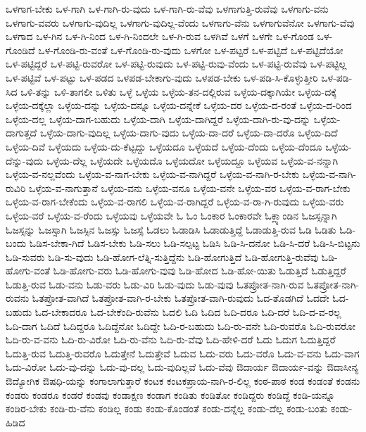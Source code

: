 {ಒಳಗಾಗ-ಬೇಕು
ಒಳ-ಗಾಗಿ
ಒಳ-ಗಾಗಿ-ರು-ವುದು
ಒಳ-ಗಾಗಿ-ರು-ವೆವು
ಒಳಗಾಗುತ್ತಿ-ರುವೆವು
ಒಳಗಾಗು-ವನು
ಒಳಗಾಗು-ವವರು
ಒಳಗಾಗು-ವುದಿಲ್ಲ
ಒಳಗಾಗು-ವುದಿಲ್ಲ-ವೆಂದು
ಒಳಗಾಗು-ವೆನು
ಒಳಗಾಗುವೆನೋ
ಒಳಗಾಗು-ವೆವು
ಒಳಗಾದ
ಒಳ-ಗಿನ
ಒಳ-ಗಿ-ನಿಂದ
ಒಳ-ಗಿ-ನಿಂದಲೇ
ಒಳ-ಗಿ-ರುವ
ಒಳಗಿವೆ
ಒಳಗೆ
ಒಳಗೇ
ಒಳ-ಗೊಂಡ
ಒಳ-ಗೊಂಡಿದೆ
ಒಳ-ಗೊಂಡಿ-ರು-ವಂತೆ
ಒಳ-ಗೊಂಡಿ-ರು-ವುದು
ಒಳಗೋ
ಒಳ-ಪಟ್ಟರೆ
ಒಳ-ಪಟ್ಟಿದೆ
ಒಳ-ಪಟ್ಟಿದೆಯೋ
ಒಳ-ಪಟ್ಟಿದ್ದರೆ
ಒಳ-ಪಟ್ಟಿ-ರುವರೋ
ಒಳ-ಪಟ್ಟಿ-ರುವುದು
ಒಳ-ಪಟ್ಟಿ-ರುವು-ವೆಂದು
ಒಳ-ಪಟ್ಟಿ-ರುವೆವು
ಒಳ-ಪಟ್ಟಿಲ್ಲ
ಒಳ-ಪಟ್ಟಿವೆ
ಒಳ-ಪಟ್ಟು
ಒಳ-ಪಡದ
ಒಳಪಡ-ಬೇಕಾಗು-ವುದು
ಒಳಪಡ-ಬೇಕು
ಒಳ-ಪಡಿ-ಸಿ-ಕೊಳ್ಳುತ್ತೀರಿ
ಒಳ-ಪಡಿ-ಸಿದ
ಒಳಿ-ತನ್ನು
ಒಳಿ-ತಾಗಲೀ
ಒಳಿತು
ಒಳ್ಳೆ
ಒಳ್ಳೆಯ
ಒಳ್ಳೆಯ-ತನ-ದಲ್ಲಿರುವ
ಒಳ್ಳೆಯ-ದಕ್ಕಾಗಿಯೇ
ಒಳ್ಳೆಯ-ದಕ್ಕೆ
ಒಳ್ಳೆಯ-ದಕ್ಕೆಲ್ಲಾ
ಒಳ್ಳೆಯ-ದನ್ನು
ಒಳ್ಳೆಯ-ದನ್ನೂ
ಒಳ್ಳೆಯ-ದನ್ನೇಕೆ
ಒಳ್ಳೆಯ-ದರ
ಒಳ್ಳೆಯ-ದ-ರಂತೆ
ಒಳ್ಳೆಯ-ದ-ರಿಂದ
ಒಳ್ಳೆಯ-ದಲ್ಲ
ಒಳ್ಳೆಯ-ದಾಗ-ಬಹುದು
ಒಳ್ಳೆಯ-ದಾಗಿ
ಒಳ್ಳೆಯ-ದಾಗಿದ್ದರೆ
ಒಳ್ಳೆಯ-ದಾಗಿ-ರು-ವು-ದನ್ನು
ಒಳ್ಳೆಯ-ದಾಗುತ್ತದೆ
ಒಳ್ಳೆಯ-ದಾಗು-ವುದಿಲ್ಲ
ಒಳ್ಳೆಯ-ದಾಗು-ವುದು
ಒಳ್ಳೆಯ-ದಾ-ದರೆ
ಒಳ್ಳೆಯ-ದಾ-ದರೊ
ಒಳ್ಳೆಯ-ದಿದೆ
ಒಳ್ಳೆಯ-ದಿವೆ
ಒಳ್ಳೆಯದು
ಒಳ್ಳೆಯ-ದು-ಕೆಟ್ಟದ್ದು
ಒಳ್ಳೆಯದೂ
ಒಳ್ಳೆಯದೆ
ಒಳ್ಳೆಯ-ದೆಂದು
ಒಳ್ಳೆಯ-ದೆಂದೂ
ಒಳ್ಳೆಯ-ದೆನ್ನು-ವುದು
ಒಳ್ಳೆಯ-ದೆಲ್ಲ
ಒಳ್ಳೆಯದೇ
ಒಳ್ಳೆಯದೊ
ಒಳ್ಳೆಯದೋ
ಒಳ್ಳೆಯದ್ದೂ
ಒಳ್ಳೆಯವ
ಒಳ್ಳೆಯ-ವ-ನನ್ನಾಗಿ
ಒಳ್ಳೆಯ-ವ-ನಲ್ಲವೆಂದು
ಒಳ್ಳೆಯ-ವ-ನಾಗ-ಬೇಕು
ಒಳ್ಳೆಯ-ವ-ನಾಗಿದ್ದರೆ
ಒಳ್ಳೆಯ-ವ-ನಾಗಿ-ರ-ಬೇಕು
ಒಳ್ಳೆಯ-ವ-ನಾಗಿ-ರುವಿರಿ
ಒಳ್ಳೆಯ-ವ-ನಾಗುತ್ತಾನೆ
ಒಳ್ಳೆಯ-ವನು
ಒಳ್ಳೆಯ-ವನೂ
ಒಳ್ಳೆಯ-ವನೇ
ಒಳ್ಳೆಯ-ವರ
ಒಳ್ಳೆಯ-ವ-ರಾಗ-ಬೇಕು
ಒಳ್ಳೆಯ-ವ-ರಾಗ-ಬೇಕೆಂದು
ಒಳ್ಳೆಯ-ವ-ರಾಗಲಿ
ಒಳ್ಳೆಯ-ವ-ರಾಗಿದ್ದರೆ
ಒಳ್ಳೆಯ-ವ-ರಾ-ಗಿ-ರುವುದು
ಒಳ್ಳೆಯ-ವರು
ಒಳ್ಳೆಯ-ವರೆ
ಒಳ್ಳೆಯ-ವ-ರೆಂದು
ಒಳ್ಳೆಯವು
ಒಳ್ಳೆಯವೇ
ಓ
ಓಂ
ಓಂಕಾರ
ಓಂಕಾರವೇ
ಓಕ್ಲ್ಯಾಂಡಿನ
ಓಜಸ್ಸನ್ನಾಗಿ
ಓಜಸ್ಸನ್ನು
ಓಜಸ್ಸಾಗಿ
ಓಜಸ್ಸಿನ
ಓಜಸ್ಸು
ಓಜಸ್ಸೆ
ಓಡಲು
ಓಡಾಡಿಸಿ
ಓಡಾಡುತ್ತಿದ್ದೆ
ಓಡಾಡುತ್ತಿ-ರುವ
ಓಡಿ
ಓಡಿತು
ಓಡಿ-ಬಂದು
ಓಡಿಸ-ಬೇಕಾ-ಗಿದೆ
ಓಡಿಸ-ಬೇಕು
ಓಡಿ-ಸಲು
ಓಡಿ-ಸಲ್ಪಟ್ಟ
ಓಡಿಸಿ
ಓಡಿ-ಸಿ-ದನೋ
ಓಡಿ-ಸಿ-ದರೆ
ಓಡಿ-ಸಿ-ಬಿಟ್ಟನು
ಓಡಿ-ಸುವರು
ಓಡಿ-ಸು-ವುದು
ಓಡಿ-ಹೋಗ-ಲೆತ್ನಿ-ಸುತ್ತಿದ್ದೆನು
ಓಡಿ-ಹೋಗುತ್ತಿದೆ
ಓಡಿ-ಹೋಗುತ್ತಿ-ರುವೆವು
ಓಡಿ-ಹೋಗು-ವಂತೆ
ಓಡಿ-ಹೋಗು-ವರು
ಓಡಿ-ಹೋಗು-ವುವು
ಓಡಿ-ಹೋದ
ಓಡಿ-ಹೋ-ಯಿತು
ಓಡುತ್ತಿದೆ
ಓಡುತ್ತಿದ್ದರೆ
ಓಡುತ್ತಿ-ರುವ
ಓಡು-ವನು
ಓಡು-ವರು
ಓಡು-ವಿರಿ
ಓಡು-ವುದು
ಓಡು-ವುವು
ಓತಪ್ರೋತ-ನಾಗಿ-ರುವ
ಓತಪ್ರೋತ-ನಾಗಿ-ರುವನು
ಓತಪ್ರೋತ-ವಾಗಿದೆ
ಓತಪ್ರೋತ-ವಾಗಿ-ರ-ಬೇಕು
ಓತಪ್ರೋತ-ವಾಗಿ-ರುವುದು
ಓದ-ತೊಡಗಿದೆ
ಓದದೇ
ಓದ-ಬಹುದು
ಓದ-ಬೇಕಾದರೂ
ಓದ-ಬೇಕೆಂದಿ-ರುವೆನು
ಓದಲಿ
ಓದಿ
ಓದಿದ
ಓದಿ-ದರೂ
ಓದಿ-ದರೆ
ಓದಿ-ದ-ವ-ರಲ್ಲ
ಓದಿ-ದಾಗ
ಓದಿದೆ
ಓದಿದ್ದರೂ
ಓದಿದ್ದೆನೋ
ಓದಿದ್ದೇ
ಓದಿ-ರ-ಬಹುದು
ಓದಿ-ರು-ವನೇ
ಓದಿ-ರುವರೊ
ಓದಿ-ರುವರೋ
ಓದಿ-ರು-ವ-ವನು
ಓದಿ-ರು-ವಿರೋ
ಓದಿ-ರು-ವೆನು
ಓದಿ-ರು-ವೆವು
ಓದಿ-ಹೇಳಿ-ದರೆ
ಓದು
ಓದುಗ
ಓದುತ್ತಿದ್ದರೆ
ಓದುತ್ತಿ-ರುವ
ಓದುತ್ತಿ-ರುವರೊ
ಓದುತ್ತೇನೆ
ಓದುತ್ತೇವೆ
ಓದುವ
ಓದು-ವರು
ಓದು-ವರೊ
ಓದು-ವ-ವನು
ಓದು-ವಾಗ
ಓದು-ವಿರೋ
ಓದು-ವು-ದನ್ನು
ಓದು-ವು-ದಲ್ಲ
ಓದು-ವುದಿಲ್ಲವೆ
ಓದು-ವೆವು
ಔದಾರ್ಯ
ಔದಾರ್ಯ-ವನ್ನು
ಔದಾಸೀನ್ಯ
ಔದ್ಯೋಗಿಕ
ಔಷಧಿ-ಯನ್ನು
ಕಂಗಾಲಾಗುತ್ತಾರೆ
ಕಂಟಕ
ಕಂಟಕಪ್ರಾಯ-ನಾಗಿ-ರ-ಲಿಲ್ಲ
ಕಂಠ-ಪಾಠ
ಕಂಡ
ಕಂಡಂತೆ
ಕಂಡನು
ಕಂಡರು
ಕಂಡರೂ
ಕಂಡರೆ
ಕಂಡವು
ಕಂಡಾಕ್ಷಣ
ಕಂಡಾಗ
ಕಂಡಿತು
ಕಂಡಿತೋ
ಕಂಡಿದ್ದರು
ಕಂಡಿದ್ದೆ
ಕಂಡಿ-ಯನ್ನೂ
ಕಂಡಿರ-ಬೇಕು
ಕಂಡಿ-ರು-ವೆನು
ಕಂಡಿಲ್ಲ
ಕಂಡು
ಕಂಡು-ಕೊಂಡಂತೆ
ಕಂಡು-ದನ್ನೆಲ್ಲ
ಕಂಡು-ದೆಲ್ಲ
ಕಂಡು-ಬಂತು
ಕಂಡು-ಹಿಡಿದ
}
